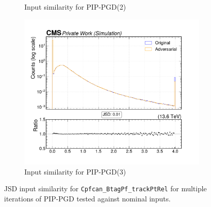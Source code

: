 \begin{figure}[htbp]
\begin{subfigure}[t]{0.32\textwidth}
    \caption*{Input similarity for PIP-PGD(2)}
  \end{subfigure}\hfill
  \begin{subfigure}[t]{0.32\textwidth}
    \includegraphics[width=\linewidth]{media/output/features/compare/combined_it_3/cmp_cpf_arr_Cpfcan_BtagPf_trackPtRel.pdf}
    \caption*{Input similarity for PIP-PGD(3)}
  \end{subfigure}

  \caption*{JSD input similarity for \texttt{Cpfcan\_BtagPf\_trackPtRel} for multiple iterations of PIP-PGD tested against nominal inputs.}
  \label{fig:combined_input_Cpfcan_BtagPf_trackPtRel}
\end{figure}

